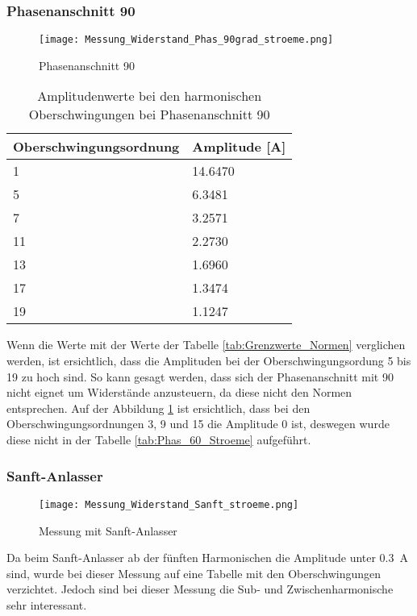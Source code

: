 \newpage
\subsubsection*{Phasenanschnitt 90\textdegree}
\begin{figure}[ht!]
	\centering
	\texttt{[image: Messung\_Widerstand\_Phas\_90grad\_stroeme.png]}	
	\caption{Phasenanschnitt 90\textdegree}\label{fig:Mess_Widerstand_Phas_90grad_stroeme}
\end{figure}

\begin{table}[ht!]
	\centering
	\begin{tabular}{|l|l|}
		\hline
		Oberschwingungsordnung & Amplitude [A] \\ \hline
		1       & 14.6470   \\ \hline
		5      & 6.3481    \\ \hline
		7      & 3.2571    \\ \hline
		11      & 2.2730    \\ \hline
		13      & 1.6960    \\ \hline
		17      & 1.3474    \\ \hline
		19      & 1.1247    \\ \hline
	\end{tabular}
	\caption{Amplitudenwerte bei den harmonischen Oberschwingungen bei Phasenanschnitt 90\textdegree}\label{tab:Phas_90_Stroeme}
\end{table}
Wenn die Werte mit der Werte der Tabelle \ref{tab:Grenzwerte_Normen} verglichen werden, ist ersichtlich, dass die Amplituden bei der Oberschwingungsordung 5 bis 19 zu hoch sind. So kann gesagt werden, dass sich der Phasenanschnitt mit 90\textdegree \hspace{0.02cm} nicht eignet um Widerstände anzusteuern, da diese nicht den Normen entsprechen. Auf der Abbildung \ref{fig:Mess_Widerstand_Phas_90grad_stroeme} ist ersichtlich, dass bei den Oberschwingungsordnungen 3, 9 und 15 die Amplitude 0 ist, deswegen wurde diese nicht in der Tabelle \ref{tab:Phas_60_Stroeme} aufgeführt.


\newpage
\subsubsection*{Sanft-Anlasser}
\begin{figure}[ht!]
	\centering
	\texttt{[image: Messung\_Widerstand\_Sanft\_stroeme.png]}	
	\caption{Messung mit Sanft-Anlasser}\label{fig:Mess_Widerstand_Sanft_stroeme}
\end{figure}
Da beim Sanft-Anlasser ab der fünften Harmonischen die Amplitude unter \SI{0.3}{A} sind, wurde bei dieser Messung auf eine Tabelle mit den Oberschwingungen verzichtet. Jedoch sind bei dieser Messung die Sub- und Zwischenharmonische sehr interessant. 

